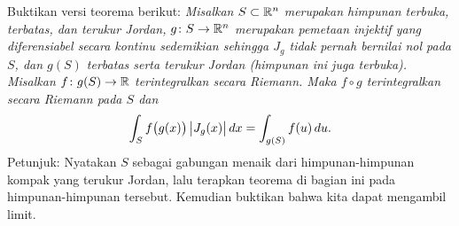 \begin{exercise}
\pagebreak[2]
Buktikan versi teorema berikut:
\emph{Misalkan $S \subset {\mathbb{R}}^n$ merupakan himpunan terbuka, terbatas, dan terukur Jordan,
$g \colon S \to {\mathbb{R}}^n$ merupakan pemetaan injektif
yang diferensiabel secara kontinu sedemikian sehingga
$J_g$ tidak pernah bernilai nol pada $S$, dan $g(S)$ terbatas serta
terukur Jordan (himpunan ini juga terbuka).
Misalkan $f \colon g(S) \to {\mathbb{R}}$ terintegralkan secara Riemann.
Maka $f \circ g$ terintegralkan secara Riemann pada $S$ dan}
\begin{equation*}
\int_S f\bigl(g(x)\bigr) \, \bigl\lvert {J_g(x)} \bigr\rvert \, dx
=
\int_{g(S)} f(u) \, du .
\end{equation*}
Petunjuk: Nyatakan $S$ sebagai gabungan menaik dari himpunan-himpunan kompak
yang terukur Jordan, lalu terapkan teorema di bagian ini pada himpunan-himpunan
tersebut. Kemudian buktikan bahwa kita dapat mengambil limit.
\end{exercise}



